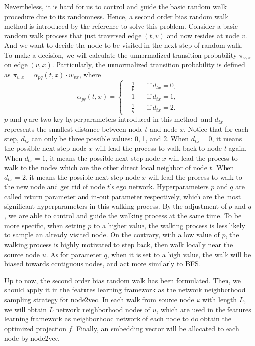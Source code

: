 \documentclass[sigconf]{acmart}
\begin{document}
Nevertheless, it is hard for us to control and guide the basic random walk procedure due to its randomness. Hence, a second order bias random walk method is introduced by the reference \cite{node2vec} to solve this problem. Consider a basic random walk process that just traversed edge $(t,v)$ and now resides at node $v$. And we want to decide the node to be visited in the next step of random walk. To make a decision, we will calculate the unnormalized transition probability $\pi_{v,x}$ on edge $(v,x)$. Particularly, the unnormalized transition probability is defined as $\pi_{v,x}=\alpha_{pq}(t,x)\cdot w_{vx}$, where
$$\alpha_{pq}(t,x)=\left\{
\begin{aligned}
& \frac{1}{p} \quad &\text{if} \ d_{tx}=0,\\
&  1          \quad &\text{if} \ d_{tx}=1,\\
& \frac{1}{q} \quad &\text{if} \ d_{tx}=2.
\end{aligned}
\right.$$
$p$ and $q$ are two key hyperparameters introduced in this method, and $d_{tx}$ represents the smallest distance between node $t$ and node $x$. Notice that for each step, $d_{tx}$ can only be three possible values: 0, 1, and 2. When $d_{tx}=0$, it means the possible next step node $x$ will lead the process to walk back to node $t$ again. When $d_{tx}=1$, it means the possible next step node $x$ will lead the process to walk to the nodes which are the other direct local neighbor of node $t$. When $d_{tx}=2$, it means the possible next step node $x$ will lead the process to walk to the new node and get rid of node $t$'s ego network. Hyperparameters $p$ and $q$ are called return parameter and in-out parameter respectively, which are the most significant hyperparameters in this walking process. By the adjustment of $p$ and $q$, we are able to control and guide the walking process at the same time. To be more specific, when setting $p$ to a higher value, the walking process is less likely to sample an already visited node. On the contrary, with a low value of $p$, the walking process is highly motivated to step back, then walk locally near the source node $u$. As for parameter $q$, when it is set to a high value, the walk will be biased towards contiguous nodes, and act more similarly to BFS. 

Up to now, the second order bias random walk has been formulated. Then, we should apply it in the features learning framework as the network neighborhood sampling strategy for node2vec. In each walk from source node $u$ with length $L$, we will obtain $L$ network neighborhood nodes of $u$, which are used in the features learning framework as neighborhood network of each node to do obtain the optimized projection $f$. Finally, an embedding vector will be allocated to each node by node2vec.
\end{document}
